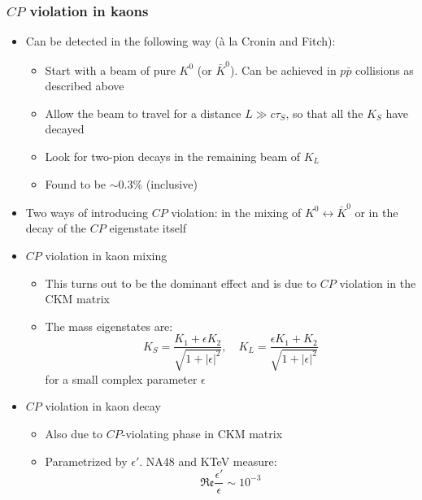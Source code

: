 \documentclass[11pt]{article}
\newcommand{\CP}{\ensuremath{CP}\xspace}
\begin{document}
  \subsubsection{\CP violation in kaons}
  \begin{itemize}
    \item Can be detected in the following way (\`a la Cronin and Fitch):
    \begin{itemize}
      \item Start with a beam of pure $K^0$ (or $\bar K^0$). Can be achieved in $p\bar p$ collisions as described above
      \item Allow the beam to travel for a distance $L\gg c\tau_S$, so that all the $K_S$ have decayed
      \item Look for two-pion decays in the remaining beam of $K_L$
      \item Found to be $\sim 0.3\%$ (inclusive)
    \end{itemize}
    \item Two ways of introducing \CP violation: in the mixing of $K^0\leftrightarrow \bar K^0$ or in the decay of the \CP eigenstate itself
    \item \CP violation in kaon mixing
    \begin{itemize}
      \item This turns out to be the dominant effect and is due to \CP violation in the CKM matrix
      \item The mass eigenstates are:
      \begin{equation}
        K_S = \frac{K_1 + \epsilon K_2}{\sqrt{1+|\epsilon|^2}},\quad K_L = \frac{\epsilon K_1 +  K_2}{\sqrt{1+|\epsilon|^2}}
      \end{equation}
      for a small complex parameter $\epsilon$
    \end{itemize}
    \item \CP violation in kaon decay
    \begin{itemize}
      \item Also due to \CP-violating phase in CKM matrix
      \item Parametrized by $\epsilon'$. NA48 and KTeV measure:
      \begin{equation}
        \mathfrak{Re} \frac{\epsilon'}{\epsilon} \sim 10^{-3}
      \end{equation}
    \end{itemize}
  \end{itemize}
\end{document}
